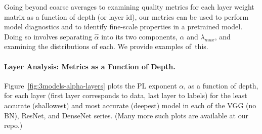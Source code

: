 
Going beyond coarse averages to examining quality metrics for each layer weight matrix as a function of depth (or layer id), our metrics can be used to perform model diagnostics and to identify fine-scale properties in a pretrained model.
Doing so involves separating $\hat{\alpha}$ into its two components, $\alpha$ and $\lambda_{max}$, and examining the distributions of each.
We provide examples of~this.


\paragraph{Layer Analysis: Metrics as a Function of Depth.}

Figure~\ref{fig:3models-alpha-layers} plots the PL exponent $\alpha$, as a function of depth, for each layer (first layer corresponds to data, last layer to labels) for the least accurate (shallowest) and most accurate (deepest) model in each of the VGG (no BN), ResNet, and DenseNet series.
(Many more such plots are available at our repo.)

